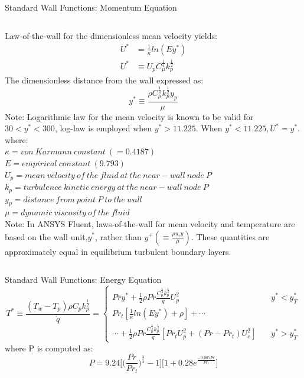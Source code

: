 \begin{frame}{Standard Wall Functions: Momentum Equation\cite{ansys2017ansys}}
\begin{columns}
    Law-of-the-wall for the dimensionless mean velocity yields:
  \begin{align*}
    U^* &= \frac{1}{\kappa}ln(Ey^*)\\
    U^* &\equiv U_p C_{\mu}^\frac{1}{4} k_p^\frac{1}{2} 
  \end{align*}
  The dimensionless distance from the wall expressed as:
  \begin{equation}
      y^* \equiv \frac{\rho C_{\mu}^\frac{1}{4} k_p^\frac{1}{2} y_p}{\mu}
  \end{equation}
  \scriptsize Note: Logarithmic law for the mean velocity is known to be valid for $30<y^*<300$, log-law is employed when $y^*>11.225$. When $y^*<11.225, U^*=y^*$.
  where:\\
  $\kappa = von\: Karmann\:constant\:(=0.4187)$ \\
  $E = empirical\:constant\:(9.793)$ \\
  $U_{p} = mean\:velocity\:of\:the\:fluid\:at\:the\:near-wall\:node\:P$ \\
  $k_p = turbulence\:kinetic\:energy\:at\:the\: near-wall\:node\:P$\\
  $y_p = distance\:from\:point\:P\:to\:the\:wall$\\
  $\mu = dynamic\:viscosity\:of\:the\:fluid$\\
  \scriptsize Note: In ANSYS Fluent, laws-of-the-wall for mean velocity and temperature are based on the wall unit,$y^*$, rather than $y^+ (\equiv \frac{\rho u_{\tau} y}{\mu})$. These quantities are approximately equal in equilibrium turbulent boundary layers.
\end{columns}
\end{frame}

\begin{frame}{Standard Wall Functions: Energy Equation\cite{ansys2017ansys}}
    \begin{equation*}
     T^* \equiv \frac{(T_w - T_p)\rho C_p k_p^\frac{1}{2}}{\Dot{q}} = \left\{
        \begin{array}{ll}
            Pry^* + \frac{1}{2} \rho Pr \frac{C_\mu^\frac{1}{4}k_p^\frac{1}{2}}{\Dot{q}} U_p^2 & \quad y^* < y_T^* \\
            Pr_t[\frac{1}{\kappa}ln(Ey^*)+\rho]+\cdots \\
            \cdots + \frac{1}{2} \rho Pr \frac{C_\mu^\frac{1}{4}k_p^\frac{1}{2}}{\Dot{q}}[Pr_tU_p^2 + (Pr-Pr_t)U_c^2]  & \quad y^* > y_T^* 
        \end{array}
    \right.
    \end{equation*}
  where P is computed as:
    \begin{equation}
        P = 9.24 \bigg[\bigg(\frac{Pr}{Pr_t}\bigg)^\frac{3}{4}-1\bigg]\bigg[1 + 0.28e^\frac{-0.007Pr}{Pr_t}\bigg]
    \end{equation}
    \label{stdwallfuncenergyeqn}
\end{frame}

